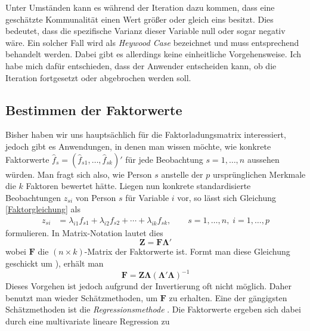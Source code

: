 \documentclass[11pt]{scrartcl}
\begin{document}
	Unter Umständen kann es während der Iteration dazu kommen, dass eine geschätzte
	Kommunalität einen Wert größer oder gleich eins besitzt. Dies bedeutet, dass die spezifische
	Varianz dieser Variable null oder sogar negativ wäre. Ein solcher Fall wird als
	\textit{Heywood Case} bezeichnet \parencite{Heywood.1931} und muss entsprechend behandelt werden.
	Dabei gibt es allerdings keine einheitliche Vorgehensweise. Ich habe mich dafür entschieden,
	dass der Anwender entscheiden kann, ob die Iteration fortgesetzt oder abgebrochen werden soll.
	\newpage
	
	\subsection{Bestimmen der Faktorwerte}
	\label{Faktorwerte}
	Bisher haben wir uns hauptsächlich für die Faktorladungsmatrix interessiert, jedoch gibt es Anwendungen, in denen man wissen möchte, wie konkrete Faktorwerte $\hat{f}_s = (\hat{f}_{s1}, \dotsc,
	\hat{f}_{sk})'$ für jede Beobachtung $s = 1, \dotsc ,n $ aussehen würden. Man fragt sich also, wie Person $s$
	anstelle der $p$ ursprünglichen Merkmale die $k$ Faktoren bewertet hätte. Liegen nun konkrete
	standardisierte Beobachtungen $z_{si}$ von Person $s$ für Variable $i$ vor, so lässt sich Gleichung \ref{Faktorgleichung} als
	\begin{equation}
		\begin{split}
			z_{si} &= \lambda_{i1} f_{s1} + \lambda_{i2} f_{s2}+ \dotsb + \lambda_{ik} f_{sk}, \qquad s=1, \dotsc, n, \; i=1, \dotsc, p
		\end{split} 
	\end{equation}
	formulieren. In Matrix-Notation lautet dies
	\begin{equation}
		\mathbf{Z} = \mathbf{F} \mathbf{\Lambda'}
	\end{equation}
	wobei $\mathbf{F}$ die $(n \times k)$-Matrix der Faktorwerte ist. Formt man diese Gleichung geschickt
	um \parencite[vgl.][453 - 454]{Backhaus.2021}), erhält man
	\begin{equation}
		\mathbf{F} = \mathbf{Z}\mathbf{\Lambda} \left( \mathbf{\Lambda'\Lambda}\right)^{-1}
	\end{equation}
	Dieses Vorgehen ist jedoch aufgrund der Invertierung oft nicht möglich. Daher
	benutzt man wieder Schätzmethoden, um  $\mathbf{F}$ zu erhalten.
	Eine der gängigsten Schätzmethoden ist die \textit{Regressionsmethode} \parencite[439 - 440]{Rencher.2002}.
	Die Faktorwerte ergeben sich dabei durch eine multivariate lineare Regression zu
\end{document}
